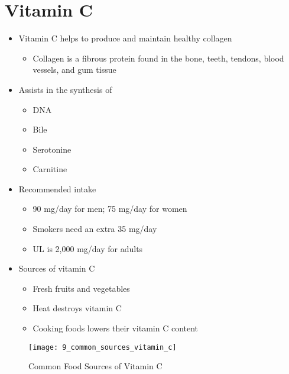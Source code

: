 \documentclass[title={Chapter 9}]{fdsn201notes}
\begin{document}
\section{Vitamin C}\label{sec:vitamin-c-9}
\begin{itemize}
	\item Vitamin C helps to produce and maintain healthy collagen
	\begin{itemize}
		\item Collagen is a fibrous protein found in the bone, teeth, tendons, blood vessels, and gum tissue
	\end{itemize}
	\item Assists in the synthesis of
	\begin{itemize}
		\item DNA
		\item Bile
		\item Serotonine
		\item Carnitine
	\end{itemize}
	\item Recommended intake
	\begin{itemize}
		\item 90 mg/day for men; 75 mg/day for women
		\item Smokers need an extra 35 mg/day
		\item UL is 2,000 mg/day for adults
	\end{itemize}
	\item Sources of vitamin C
	\begin{itemize}
		\item Fresh fruits and vegetables
		\item Heat destroys vitamin C
		\item Cooking foods lowers their vitamin C content
	\end{itemize}
\end{itemize}

\begin{figure}[H]
	\centering
	\texttt{[image: 9\_common\_sources\_vitamin\_c]}
	\caption{Common Food Sources of Vitamin C}
	\label{fig:common-sources-vitamin-c}
\end{figure}
\end{document}
